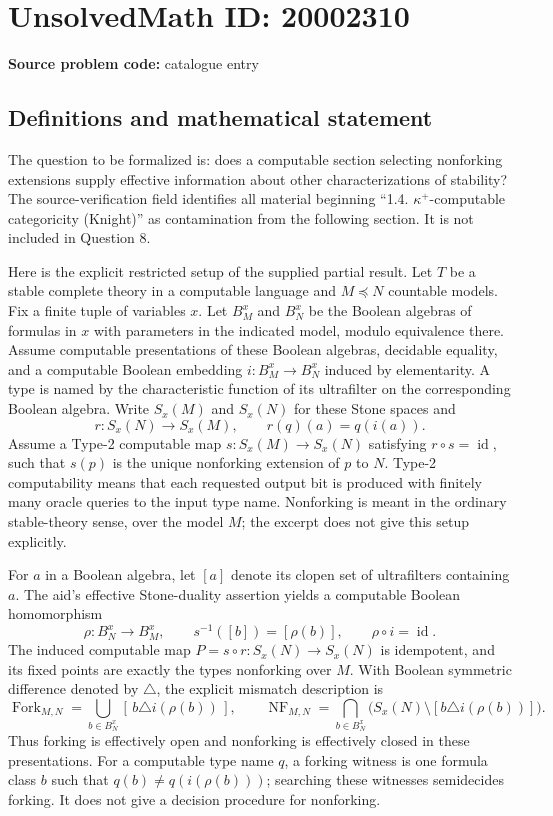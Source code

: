 \documentclass[11pt]{article}
\begin{document}
\section*{UnsolvedMath ID: 20002310}
\textbf{Source problem code:} catalogue entry
\subsection{Definitions and mathematical statement}
The question to be formalized is: does a computable section selecting nonforking extensions supply effective information about other characterizations of stability? The source-verification field identifies all material beginning ``1.4. \(\kappa^+\)-computable categoricity (Knight)'' as contamination from the following section. It is not included in Question 8.

Here is the explicit restricted setup of the supplied partial result. Let \(T\) be a stable complete theory in a computable language and \(M\preccurlyeq N\) countable models. Fix a finite tuple of variables \(x\). Let \(B_M^x\) and \(B_N^x\) be the Boolean algebras of formulas in \(x\) with parameters in the indicated model, modulo equivalence there. Assume computable presentations of these Boolean algebras, decidable equality, and a computable Boolean embedding \(i:B_M^x\to B_N^x\) induced by elementarity. A type is named by the characteristic function of its ultrafilter on the corresponding Boolean algebra. Write \(S_x(M)\) and \(S_x(N)\) for these Stone spaces and
\[
 r:S_x(N)\to S_x(M),\qquad r(q)(a)=q(i(a)).
\]
Assume a Type-2 computable map \(s:S_x(M)\to S_x(N)\) satisfying \(r\circ s=\operatorname{id}\), such that \(s(p)\) is the unique nonforking extension of \(p\) to \(N\). Type-2 computability means that each requested output bit is produced with finitely many oracle queries to the input type name. Nonforking is meant in the ordinary stable-theory sense, over the model \(M\); the excerpt does not give this setup explicitly.

For \(a\) in a Boolean algebra, let \([a]\) denote its clopen set of ultrafilters containing \(a\). The aid's effective Stone-duality assertion yields a computable Boolean homomorphism
\[
 \rho:B_N^x\to B_M^x,\qquad
 s^{-1}([b])=[\rho(b)],\qquad \rho\circ i=\operatorname{id}.
\]
The induced computable map \(P=s\circ r:S_x(N)\to S_x(N)\) is idempotent, and its fixed points are exactly the types nonforking over \(M\). With Boolean symmetric difference denoted by \(\triangle\), the explicit mismatch description is
\[
 \operatorname{Fork}_{M,N}
 =\bigcup_{b\in B_N^x}[\,b\triangle i(\rho(b))\,],\qquad
 \operatorname{NF}_{M,N}
 =\bigcap_{b\in B_N^x}\bigl(S_x(N)\setminus[b\triangle i(\rho(b))]\bigr).
\]
Thus forking is effectively open and nonforking is effectively closed in these presentations. For a computable type name \(q\), a forking witness is one formula class \(b\) such that \(q(b)\ne q(i(\rho(b)))\); searching these witnesses semidecides forking. It does not give a decision procedure for nonforking.
\end{document}

